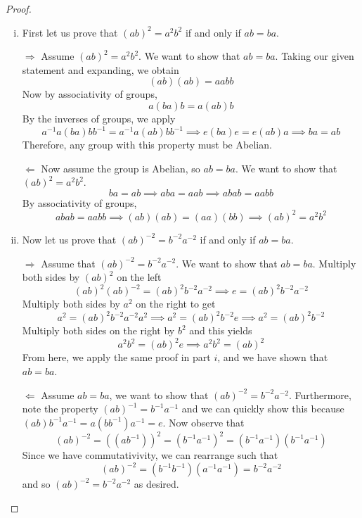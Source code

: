 \documentclass[12pt]{scrartcl}
\begin{document}
\begin{proof}
  
\hfill

\begin{enumerate}[(i)]
  \item First let us prove that $(ab)^2 = a^2b^2$ if and only if $ab = ba$. 
  
  $\Longrightarrow$ Assume $(ab)^2 = a^2b^2$. We want to show that $ab = ba$.
  Taking our given statement and expanding, we obtain
  \[(ab)(ab) = aabb\]
  Now by associativity of groups, 
  \[a(ba)b = a(ab)b\]
  By the inverses of groups, we apply 
  \[a^{-1} a (ba) b b^{-1} = a^{-1} a(ab) b b^{-1} \implies e(ba)e = e(ab)a \implies ba = ab\]
  Therefore, any group with this property must be Abelian. 

  $\Longleftarrow$ Now assume the group is Abelian, so $ab = ba$. We want to show that $(ab)^2 = a^2b^2$. 
  \[ba = ab \implies aba = aab \implies abab = aabb\]
  By associativity of groups, 
  \[abab = aabb \implies (ab)(ab) = (aa)(bb) \implies (ab)^2 = a^2b^2\]

  \item Now let us prove that $(ab)^{-2} = b^{-2}a^{-2}$ if and only if $ab = ba$.
  
  $\Longrightarrow$ Assume that $(ab)^{-2} = b^{-2}a^{-2}$. We want to show that $ab = ba$. Multiply 
  both sides by $(ab)^2$ on the left
  \[(ab)^2 (ab)^{-2} = (ab)^2 b^{-2}a^{-2} \implies e = (ab)^2b^{-2}a^{-2}\]
  Multiply both sides by $a^2$ on the right to get 
  \[a^2 = (ab)^2b^{-2} a^{-2} a^2 \implies a^2 = (ab)^2 b^{-2} e \implies a^2 = (ab)^2b^{-2}\]
  Multiply both sides on the right by $b^2$ and this yields 
  \[a^2b^2 = (ab)^2e \implies a^2b^2 = (ab)^2\]
  From here, we apply the same proof in part $i$, and we have shown that $ab = ba$.

  $\Longleftarrow$ Assume $ab = ba$, we want to show that $(ab)^{-2} = b^{-2}a^{-2}$. Furthermore, note 
  the property $(ab)^{-1} = b^{-1}a^{-1}$ and we can quickly show this because $(ab)b^{-1}a^{-1} = a(bb^{-1})a^{-1} = e$. Now observe that 
  \[(ab)^{-2} = ((ab^{-1}))^2 = (b^{-1}a^{-1})^2 = (b^{-1}a^{-1})(b^{-1}a^{-1})\]
  Since we have commutativivity, we can rearrange such that 
  \[(ab)^{-2} = (b^{-1}b^{-1})(a^{-1}a^{-1}) = b^{-2}a^{-2}\]
  and so $(ab)^{-2} = b^{-2}a^{-2}$ as desired.
\end{enumerate}

\end{proof}

\newpage 
\end{document}
